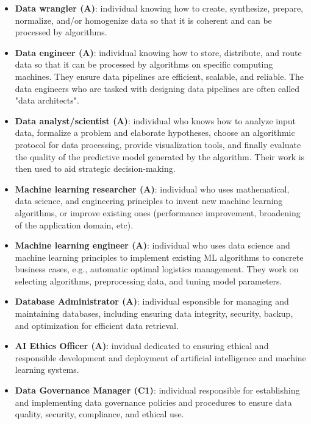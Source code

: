 \documentclass{article}
\begin{document}
\begin{itemize}
    \item \textbf{Data wrangler (A)}: individual knowing how to create, synthesize, prepare, normalize, and/or homogenize data so that it is coherent and can be processed by algorithms.
    
    \item \textbf{Data engineer (A)}: individual knowing how to store, distribute, and route data so that it can be processed by algorithms on specific computing machines. They ensure data pipelines are efficient, scalable, and reliable. The data engineers who are tasked with designing data pipelines are often called "data architects".
    
    \item \textbf{Data analyst/scientist (A)}: individual who knows how to analyze input data, formalize a problem and elaborate hypotheses, choose an algorithmic protocol for data processing, provide visualization tools, and finally evaluate the quality of the predictive model generated by the algorithm. Their work is then used to aid strategic decision-making.
    
    \item \textbf{Machine learning researcher (A)}: individual who uses mathematical, data science, and engineering principles to invent new machine learning algorithms, or improve existing ones (performance improvement, broadening of the application domain, etc).
    
    \item \textbf{Machine learning engineer (A)}: individual who uses data science and machine learning principles to implement existing ML algorithms to concrete business cases, e.g., automatic optimal logistics management. They work on selecting algorithms, preprocessing data, and tuning model parameters.
    
    \item \textbf{Database Administrator (A)}: individual esponsible for managing and maintaining databases, including ensuring data integrity, security, backup, and optimization for efficient data retrieval.
    
    \item \textbf{AI Ethics Officer (A)}: invidual dedicated to ensuring ethical and responsible development and deployment of artificial intelligence and machine learning systems.

    \item \textbf{Data Governance Manager (C1)}: individual responsible for establishing and implementing data governance policies and procedures to ensure data quality, security, compliance, and ethical use.
    

\end{itemize}
\end{document}
